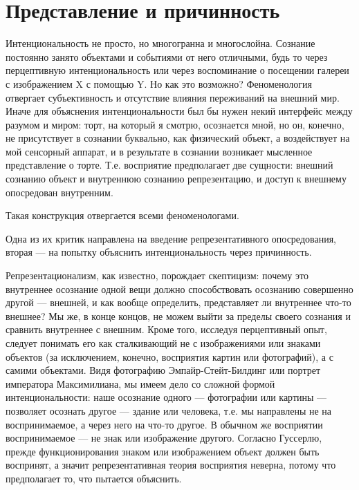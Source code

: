\documentclass[11pt]{book}
\begin{document}
\section{Представление и причинность}

Интенциональность не просто, но многогранна и многослойна. Сознание постоянно занято объектами и событиями от него отличными, будь то через перцептивную интенциональность или через воспоминание о посещении галереи с изображением X с помощью Y. Но как это возможно? Феноменология отвергает субъективность и отсутствие влияния переживаний на внешний мир. Иначе для объяснения интенциональности был бы нужен некий интерфейс между разумом и миром: торт, на который я смотрю, осознается мной, но он, конечно, не присутствует в сознании буквально, как физический объект, а воздействует на мой сенсорный аппарат, и в результате в сознании возникает мысленное представление о торте. Т.е. восприятие предполагает две сущности: внешний сознанию объект и внутреннюю сознанию репрезентацию, и доступ к внешнему опосредован внутренним.

Такая конструкция отвергается всеми феноменологами.

Одна из их критик направлена на введение репрезентативного опосредования, вторая --- на попытку объяснить интенциональность через причинность.

Репрезентационализм, как известно, порождает скептицизм: почему это внутреннее осознание одной вещи должно способствовать осознанию совершенно другой --- внешней, и как вообще определить, представляет ли внутреннее что-то внешнее? Мы же, в конце концов, не можем выйти за пределы своего сознания и сравнить внутреннее с внешним. Кроме того, исследуя перцептивный опыт, следует понимать его как сталкивающий не с изображениями или знаками объектов (за исключением, конечно, восприятия картин или фотографий), а с самими объектами. Видя фотографию Эмпайр-Стейт-Билдинг или портрет императора Максимилиана, мы имеем дело со сложной формой интенциональности: наше осознание одного --- фотографии или картины --- позволяет осознать другое --- здание или человека, т.е. мы направлены не на воспринимаемое, а через него на что-то другое. В обычном же восприятии воспринимаемое --- не знак или изображение другого. Согласно Гуссерлю, прежде функционирования знаком или изображением объект должен быть воспринят, а значит репрезентативная теория восприятия неверна, потому что предполагает то, что пытается объяснить.
\end{document}
